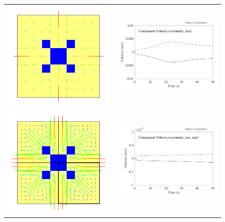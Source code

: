\documentclass[11pt]{book}
\begin{document}
\begin{figure}[!ht]
\begin{tabular*}{\textwidth}{lr}
\includegraphics[width=3.2in]{SCRIPT_FIGURES/symmetry_test} &
\includegraphics[width=3.2in]{SCRIPT_FIGURES/symmetry_test_plot} \\
\includegraphics[width=3.2in]{SCRIPT_FIGURES/symmetry_test_mpi} &
\includegraphics[width=3.2in]{SCRIPT_FIGURES/symmetry_test_mpi_plot}

\end{tabular*}
\end{figure}
\end{document}
